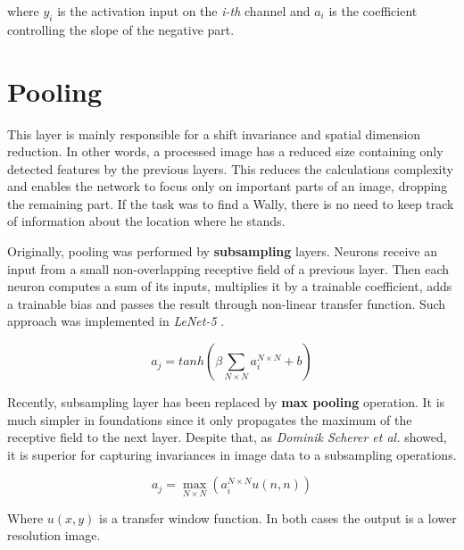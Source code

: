 where $y_i$ is the activation input on the \emph{i-th} channel and $a_i$ is the coefficient controlling the slope of the negative part. 

\section{Pooling}
\label{sec:conv-pooling}

This layer is mainly responsible for a shift invariance and spatial dimension reduction. In other words, a processed image has a reduced size containing only detected features by the previous layers. This reduces the calculations complexity and enables the network to focus only on important parts of an image, dropping the remaining part. If the task was to find a Wally, there is no need to keep track of information about the location where he stands.

Originally, pooling was performed by \textbf{subsampling} layers. Neurons receive an input from a small non-overlapping receptive field of a previous layer. Then each neuron computes a sum of its inputs, multiplies it by a trainable coefficient, adds a trainable bias and passes the result through non-linear transfer function. Such approach was implemented in \emph{LeNet-5} \cite{GradientBasedLearningDigitRec}.

\begin{equation}
    a_j = tanh\left(\beta \sum_{N \times N} a_i^{N \times N} + b \right)
\end{equation}

Recently, subsampling layer has been replaced by \textbf{max pooling} operation. It is much simpler in foundations since it only propagates the maximum of the receptive field to the next layer. Despite that, as \emph{Dominik Scherer et al.} \cite{MaxPool} showed, it is superior for capturing invariances in image data to a subsampling operations.

\begin{equation}
    a_j = \max_{N \times N} \left( a_i^{N \times N} u(n, n) \right)
\end{equation}

Where $u(x, y)$ is a transfer window function. In both cases the output is a lower resolution image.
